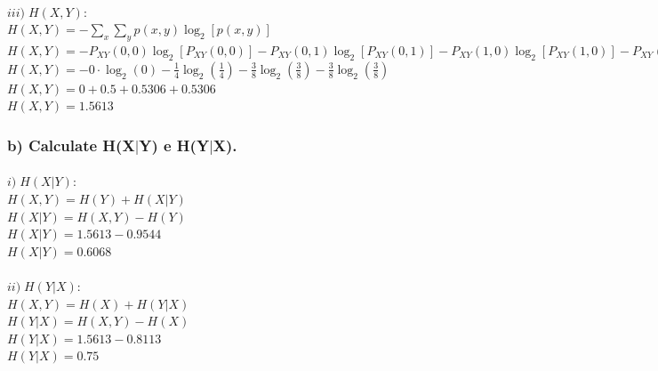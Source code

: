 \documentclass[a4paper]{article}
\begin{document}
\paragraph{$ iii) \; H(X,Y):                                $
\\
$ \displaystyle 
    H(X,Y) = -\sum_x \sum_y p(x,y) \log_2 [p(x,y)]            $\\
$ H(X,Y) = - P_{XY}(0,0) \log_2 [P_{XY}(0,0)]                
         - P_{XY}(0,1) \log_2 [P_{XY}(0,1)] 
         - P_{XY}(1,0) \log_2 [P_{XY}(1,0)] 
         - P_{XY}(1,1) \log_2 [P_{XY}(1,1)]                 $\\
$ \displaystyle
    H(X,Y) = - 0 \cdot \log_2 (0)                              
          - \frac{1}{4} \log_2 \left( \frac{1}{4} \right)
          - \frac{3}{8} \log_2 \left( \frac{3}{8} \right)
          - \frac{3}{8} \log_2 \left( \frac{3}{8} \right)   $\\
$ H(X,Y) = 0 + 0.5 + 0.5306 + 0.5306                          $\\
$ \boxed{ H(X,Y) = 1.5613 }                                   $\\
}

\subsubsection{b) Calculate H(X$|$Y) e H(Y$|$X).}

\paragraph{$ i) \; H(X|Y):      $
\\
$ H(X,Y) = H(Y) + H(X|Y)        $\\
$ H(X|Y) = H(X,Y) - H(Y)        $\\
$ H(X|Y) = 1.5613 - 0.9544      $\\
$ \boxed{ H(X|Y) = 0.6068 }     $\\
}
\paragraph{$ ii) \; H(Y|X):     $
\\
$ H(X,Y) = H(X) + H(Y|X)        $\\
$ H(Y|X) = H(X,Y) - H(X)        $\\
$ H(Y|X) = 1.5613 - 0.8113      $\\
$ \boxed{ H(Y|X) = 0.75 }       $\\
}
\end{document}
